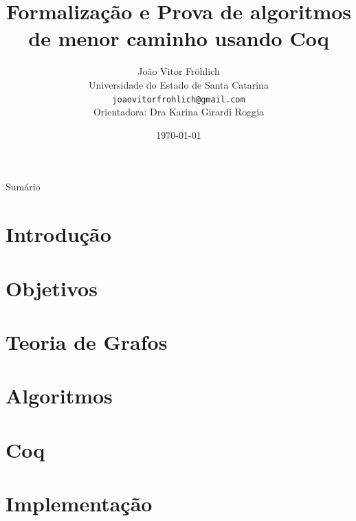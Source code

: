 \documentclass[xcolor=table]{beamer}
\title[]{Formalização e Prova de algoritmos de menor caminho usando Coq}
\author[João Vitor Fr\"ohlich]{
    João Vitor Fr\"ohlich\\\smallskip
    {\scriptsize Universidade do Estado de Santa Catarina \\\smallskip
    \vspace{-2mm}
    \texttt{joaovitorfrohlich@gmail.com}\\\medskip
    {Orientadora: Dra Karina Girardi Roggia}\\
    }
}
\date{\today}
\begin{document}
    \begin{frame}
        \titlepage
    \end{frame}

    \begin{frame}[allowframebreaks]{Sumário}
        \tableofcontents
    \end{frame}

    \section[]{Introdução}
    

    \section[]{Objetivos}
    
    


    \section[]{Teoria de Grafos}
    
    
    
    
    
    

    \section[]{Algoritmos}
    
    
    

    \section[]{Coq}
    
    

    \section[]{Implementação}
    
\end{document}
